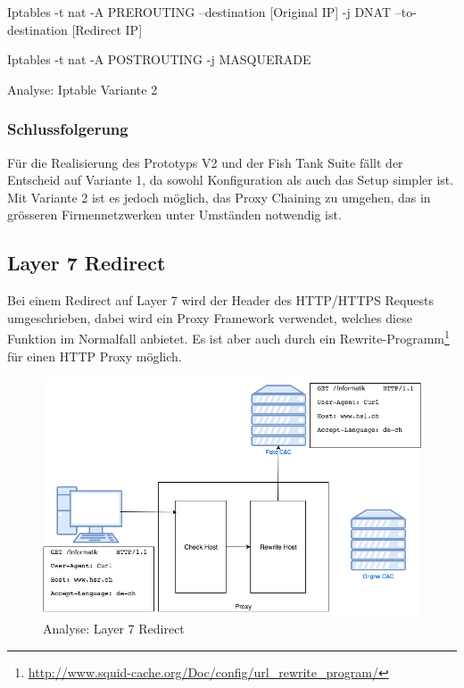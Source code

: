 \begin{listing}[H]
\begin{fancycode}
Iptables -t nat -A PREROUTING --destination [Original IP] -j DNAT --to-destination [Redirect IP]

Iptables -t nat -A POSTROUTING -j MASQUERADE
\end{fancycode}
\caption{Analyse: Iptable Variante 2}
\label{lst:Iptable: Variante 2, Proxy und Iptables auf separatem Host}
\end{listing}

\subsubsection{Schlussfolgerung}
Für die Realisierung des Prototyps V2 und der Fish Tank Suite fällt der Entscheid auf Variante 1, da sowohl Konfiguration als auch das Setup simpler ist. Mit Variante 2 ist es jedoch möglich, das Proxy Chaining zu umgehen, das in grösseren Firmennetzwerken unter Umständen notwendig ist.

\subsection{Layer 7 Redirect}
\label{analyse:layer7}
Bei einem Redirect auf Layer 7 wird der Header des HTTP/HTTPS Requests umgeschrieben, dabei wird ein Proxy Framework verwendet, welches diese Funktion im Normalfall anbietet. Es ist aber auch durch ein Rewrite-Programm\footnote{\url{http://www.squid-cache.org/Doc/config/url_rewrite_program/}} für einen HTTP Proxy möglich.

\begin{figure}[H]
	\centering
	\includegraphics[width=\textwidth]{img/Layer7-Redirect.png}
	\caption{Analyse: Layer 7 Redirect}
	\label{fig:layer7redirect}
\end{figure}

